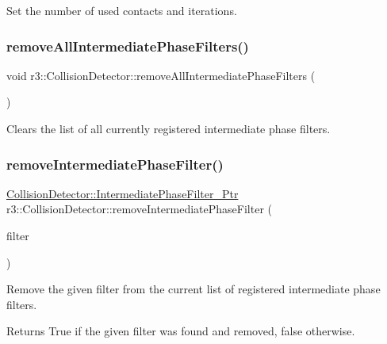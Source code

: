Set the number of used contacts and iterations. \mbox{\label{classr3_1_1_collision_detector_a780e977afd65d4a41863e712f9acb63f}} 
\subsubsection{\texorpdfstring{remove\+All\+Intermediate\+Phase\+Filters()}{removeAllIntermediatePhaseFilters()}}
{\footnotesize\ttfamily void r3\+::\+Collision\+Detector\+::remove\+All\+Intermediate\+Phase\+Filters (\begin{DoxyParamCaption}{ }\end{DoxyParamCaption})}

Clears the list of all currently registered intermediate phase filters. \mbox{\label{classr3_1_1_collision_detector_aff67a43ffc0f74ada2193f46aa3ea1fd}} 
\subsubsection{\texorpdfstring{remove\+Intermediate\+Phase\+Filter()}{removeIntermediatePhaseFilter()}}
{\footnotesize\ttfamily \mbox{\hyperlink{classr3_1_1_collision_detector_a8337c2c23ec77350b65977e043c07827}{Collision\+Detector\+::\+Intermediate\+Phase\+Filter\+\_\+\+Ptr}} r3\+::\+Collision\+Detector\+::remove\+Intermediate\+Phase\+Filter (\begin{DoxyParamCaption}\item[{\mbox{\hyperlink{classr3_1_1_i_intermediate_phase_filter}{I\+Intermediate\+Phase\+Filter}} $\ast$}]{filter }\end{DoxyParamCaption})}

Remove the given filter from the current list of registered intermediate phase filters. \begin{DoxyReturn}{Returns}
True if the given filter was found and removed, false otherwise. 
\end{DoxyReturn}
\mbox{\label{classr3_1_1_collision_detector_a8f9f9e0ecc67d950e79d024803dc916b}} 
